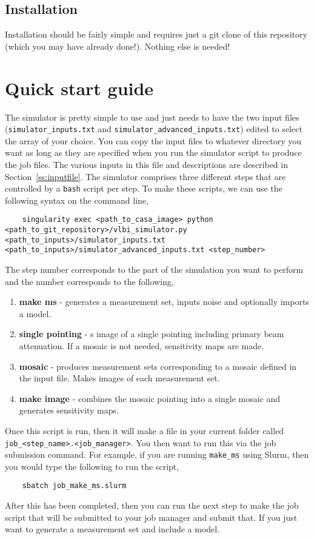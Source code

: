 \documentclass[11pt]{report_jfr}
\begin{document}
\subsection{Installation}

Installation should be fairly simple and requires just a git clone of this repository (which you may have already done!). Nothing else is needed!

\section{Quick start guide}

The simulator is pretty simple to use and just needs to have the two input files (\texttt{simulator\_inputs.txt} and \texttt{simulator\_advanced\_inputs.txt}) edited to select the array of your choice. You can copy the input files to whatever directory you want as long as they are specified when you run the simulator script to produce the job files. The various inputs in this file and descriptions are described in Section~\ref{ss:inputfile}. The simulator comprises three different steps that are controlled by a \texttt{bash} script per step. To make these scripts, we can use the following syntax on the command line,
%
\begin{lstlisting}
	singularity exec <path_to_casa_image> python <path_to_git_repository>/vlbi_simulator.py <path_to_inputs>/simulator_inputs.txt <path_to_inputs>/simulator_advanced_inputs.txt <step_number>
\end{lstlisting}
%
The step number corresponds to the part of the simulation you want to perform and the number corresponds to the following,
%
\begin{enumerate}
	\item \textbf{make ms} - generates a measurement set, inputs noise and optionally imports a model.
	\item \textbf{single pointing} - s image of a single pointing including primary beam attenuation. If a mosaic is not needed, sensitivity maps are made.
	\item \textbf{mosaic} - produces measurement sets corresponding to a mosaic defined in the input file. Makes images of each measurement set.
	\item \textbf{make image} - combines the mosaic pointing into a single mosaic and generates sensitivity maps.
\end{enumerate}
%
Once this script is run, then it will make a file in your current folder called \texttt{job\_<step\_name>.<job\_manager>}. You then want to run this via the job submission command. For example, if you are running \texttt{make\_ms} using Slurm, then you would type the following to run the script,
%
\begin{lstlisting}
	sbatch job_make_ms.slurm
\end{lstlisting}
%
After this has been completed, then you can run the next step to make the job script that will be submitted to your job manager and submit that. If you just want to generate a measurement set and include a model.
\end{document}
